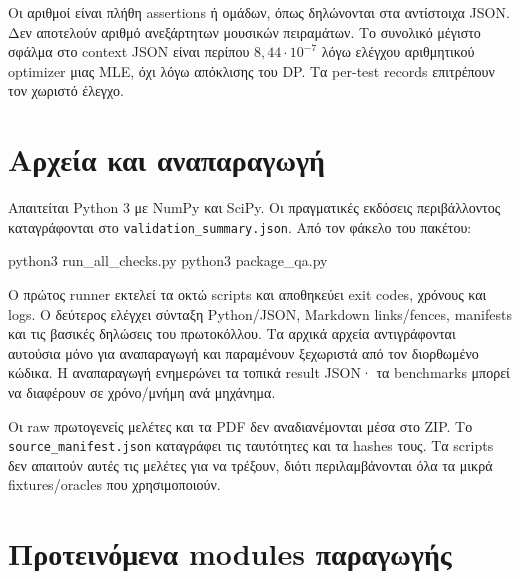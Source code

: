 \documentclass[
  10pt,
  a4paper,
]{report}
\newenvironment{Shaded}{}{}
\newcommand{\ExtensionTok}[1]{#1}
\newcommand{\NormalTok}[1]{#1}
\begin{document}
Οι αριθμοί είναι πλήθη assertions ή ομάδων, όπως δηλώνονται στα
αντίστοιχα JSON. Δεν αποτελούν αριθμό ανεξάρτητων μουσικών πειραμάτων.
Το συνολικό μέγιστο σφάλμα στο context JSON είναι περίπου
\(8,44\cdot10^{-7}\) λόγω ελέγχου αριθμητικού optimizer μιας MLE, όχι
λόγω απόκλισης του DP. Τα per-test records επιτρέπουν τον χωριστό
έλεγχο.

\section{Αρχεία και
αναπαραγωγή}\label{ux3b1ux3c1ux3c7ux3b5ux3afux3b1-ux3baux3b1ux3b9-ux3b1ux3bdux3b1ux3c0ux3b1ux3c1ux3b1ux3b3ux3c9ux3b3ux3ae}

Απαιτείται Python 3 με NumPy και SciPy. Οι πραγματικές εκδόσεις
περιβάλλοντος καταγράφονται στο \texttt{validation\_summary.json}. Από
τον φάκελο του πακέτου:

\begin{Shaded}
\begin{Highlighting}[]
\ExtensionTok{python3}\NormalTok{ run\_all\_checks.py}
\ExtensionTok{python3}\NormalTok{ package\_qa.py}
\end{Highlighting}
\end{Shaded}

Ο πρώτος runner εκτελεί τα οκτώ scripts και αποθηκεύει exit codes,
χρόνους και logs. Ο δεύτερος ελέγχει σύνταξη Python/JSON, Markdown
links/fences, manifests και τις βασικές δηλώσεις του πρωτοκόλλου. Τα
αρχικά αρχεία αντιγράφονται αυτούσια μόνο για αναπαραγωγή και παραμένουν
ξεχωριστά από τον διορθωμένο κώδικα. Η αναπαραγωγή ενημερώνει τα τοπικά
result JSON· τα benchmarks μπορεί να διαφέρουν σε χρόνο/μνήμη ανά
μηχάνημα.

Οι raw πρωτογενείς μελέτες και τα PDF δεν αναδιανέμονται μέσα στο ZIP.
Το \texttt{source\_manifest.json} καταγράφει τις ταυτότητες και τα
hashes τους. Τα scripts δεν απαιτούν αυτές τις μελέτες για να τρέξουν,
διότι περιλαμβάνονται όλα τα μικρά fixtures/oracles που χρησιμοποιούν.

\section{Προτεινόμενα modules
παραγωγής}\label{ux3c0ux3c1ux3bfux3c4ux3b5ux3b9ux3bdux3ccux3bcux3b5ux3bdux3b1-modules-ux3c0ux3b1ux3c1ux3b1ux3b3ux3c9ux3b3ux3aeux3c2}
\end{document}
